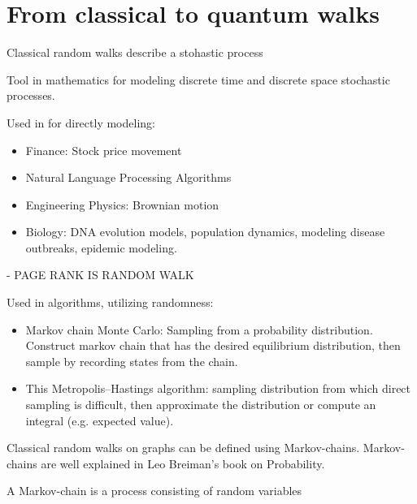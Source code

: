 \section{From classical to quantum walks}

Classical random walks describe a stohastic process

Tool in mathematics for modeling discrete time and discrete space stochastic processes.

Used in for directly modeling:
\begin{itemize}
\item Finance: Stock price movement
\item Natural Language Processing Algorithms
\item Engineering Physics: Brownian motion
\item Biology: DNA evolution models, population dynamics, modeling disease outbreaks, epidemic modeling.

\end{itemize}

- PAGE RANK IS RANDOM WALK

Used in algorithms, utilizing randomness:
\begin{itemize}
\item Markov chain Monte Carlo: Sampling from a probability distribution. Construct markov chain that has the desired equilibrium distribution, then sample by recording states from the chain.
\item This Metropolis–Hastings algorithm: sampling distribution from which direct sampling is difficult, then approximate the distribution or compute an integral (e.g. expected value).

\end{itemize}

Classical random walks on graphs can be defined using Markov-chains. Markov-chains
are well explained in Leo Breiman's book on Probability\cite{breiman_probability_1992}.

 A Markov-chain is a process consisting of random variables